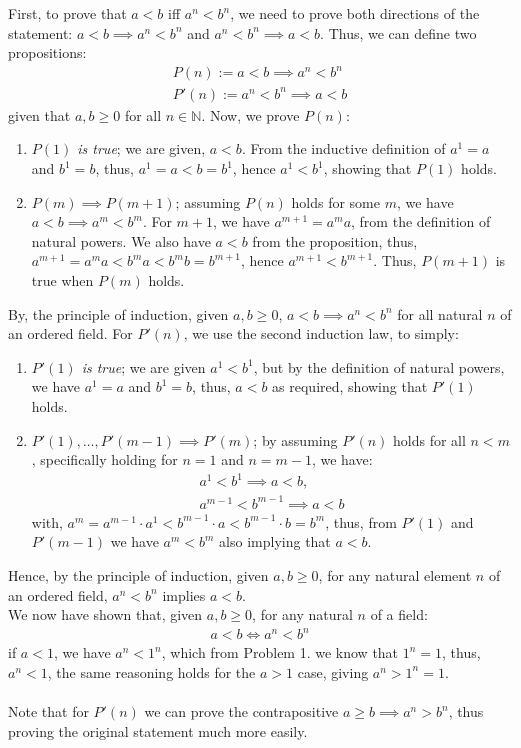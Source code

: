 \documentclass[12pt]{book}
\newcommand{\N}{\mathbb{N}}
\theoremstyle{definition}
\begin{document}
\begin{sol}
First, to prove that $a<b$ iff $a^n<b^n$, we need to prove both directions of the statement: $a<b \implies a^n <b^n$ and $a^n < b^n \implies a<b$. Thus, we can define two propositions:
\begin{align*}
	P(n) := a<b \implies a^n<b^n \\
	P'(n) := a^n<b^n \implies a<b
\end{align*}
given that $a,b \geq 0$ for all $n\in \N$. Now, we prove $P(n)$:
\begin{enumerate}[label=(\roman*)]
	\item \textit{$P(1)$  is true}; we are given, $a<b$. From the inductive definition of $a^1 = a$ and $b^1 =b$, thus, $a^1=a < b = b^1$, hence $a^1<b^1$, showing that $P(1)$ holds.
	\item $P(m) \implies P(m+1)$; assuming $P(n)$ holds for some $m$, we have $a<b \implies a^m <b^m$. For $m+1$, we have $a^{m+1} = a^ma$, from the definition of natural powers. We also have $a<b$ from the proposition, thus, $a^{m+1}=a^ma<b^ma<b^mb=b^{m+1}$, hence $a^{m+1}<b^{m+1}$. Thus, $P(m+1)$ is true when $P(m)$ holds.    
\end{enumerate}
By, the principle of induction, given $a,b\geq 0$, $a<b \implies a^n <b^n$ for all natural $n$ of an ordered field. For $P'(n)$, we use the second induction law, to simply:
\begin{enumerate}[label=(\roman*)]
	\item \textit{$P'(1)$  is true}; we are given $a^1<b^1$, but by the definition of natural powers, we have $a^1=a$ and $b^1=b$, thus, $a<b$ as required, showing that $P'(1)$ holds.
	\item $P'(1), \ldots, P'(m-1) \implies P'(m)$; by assuming $P'(n)$ holds for all $n < m$, specifically holding for $n=1$ and $n=m-1$, we have:
		\begin{align*}
			a^{1}<b^{1} \implies a<b, \\
			a^{m-1}<b^{m-1} \implies a<b
		\end{align*}
		with, $a^m=a^{m-1}\cdot a^1<b^{m-1}\cdot a < b^{m-1} \cdot b = b^{m}$, thus, from $P'(1)$ and $P'(m-1)$ we have $a^m<b^m$ also implying that $a<b$. 
\end{enumerate}
Hence, by the principle of induction, given $a,b\geq 0$, for any natural element $n$ of an ordered field, $a^n<b^n$ implies $a<b$.\\
 We now have shown that, given $a,b \geq 0$, for any natural $n$ of a field:
 \begin{align*}
 	a<b \iff a^n<b^n
 \end{align*}
if $a<1$, we have $a^n<1^n$, which from Problem 1. we know that $1^n=1$, thus, $a^n<1$, the same reasoning holds for the $a>1$ case, giving $a^n>1^n=1$.\\
\\
Note that for $P'(n)$ we can prove the contrapositive $a\geq b \implies  a^n > b^n$, thus proving the original statement much more easily.  
\end{sol}
\end{document}
